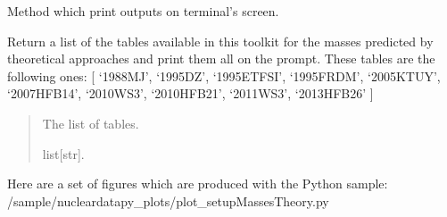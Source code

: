 \documentclass[letterpaper,10pt,english]{sphinxmanual}
\begin{document}
\begin{fulllineitems}
\begin{fulllineitems}
\end{fulllineitems}


\begin{fulllineitems}
\label{\detokenize{source/api/setup_masses_theory:nucleardatapy.setup_masses_theory.SetupMassesTheory.print_outputs}}
\pysigstartsignatures
{}
\pysigstopsignatures
\sphinxAtStartPar
Method which print outputs on terminal’s screen.

\end{fulllineitems}


\end{fulllineitems}


\begin{fulllineitems}
\label{\detokenize{source/api/setup_masses_theory:nucleardatapy.setup_masses_theory.tables_masses_theory}}
\pysigstartsignatures
{}
\pysigstopsignatures
\sphinxAtStartPar
Return a list of the tables available in this toolkit for the masses
predicted by theoretical approaches and print them all on the prompt.
These tables are the following ones:     {[} ‘1988\sphinxhyphen{}MJ’, ‘1995\sphinxhyphen{}DZ’, ‘1995\sphinxhyphen{}ETFSI’, ‘1995\sphinxhyphen{}FRDM’,     ‘2005\sphinxhyphen{}KTUY’, ‘2007\sphinxhyphen{}HFB14’, ‘2010\sphinxhyphen{}WS3’, ‘2010\sphinxhyphen{}HFB21’, ‘2011\sphinxhyphen{}WS3’, ‘2013\sphinxhyphen{}HFB26’ {]}
\begin{quote}\begin{description}
\sphinxAtStartPar
The list of tables.

\sphinxAtStartPar
list{[}str{]}.

\end{description}\end{quote}

\end{fulllineitems}


\sphinxAtStartPar
Here are a set of figures which are produced with the Python sample: /sample/nucleardatapy\_plots/plot\_setupMassesTheory.py
\end{document}
